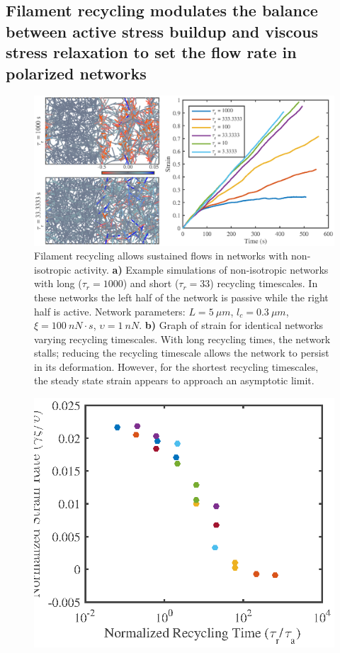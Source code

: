 \documentclass[10pt,letterpaper]{article}
\begin{document}
\subsection*{Filament recycling modulates the balance between active stress buildup and viscous stress relaxation to set the flow rate in polarized networks}


\begin{figure}[h!]
\centering
\includegraphics[width=\hsize]{figures/figure6a}
\caption{\label{fig:flow_ex}  Filament recycling allows sustained flows in networks with non-isotropic activity. \textbf{a)} Example simulations of non-isotropic networks with long ($\tau_r=1000$) and short ($\tau_r=33$) recycling timescales. In these networks the left half of the network is passive while the right half is active.  Network parameters: $L=5\: \mu m$, $l_c=0.3\: \mu m$, $\xi=100\: nN\cdot s$, $\upsilon=1\: nN$. \textbf{b)} Graph of strain for identical networks varying recycling timescales.  With long recycling times, the network stalls; reducing the recycling timescale allows the network to persist in its deformation.  However, for the shortest recycling timescales, the steady state strain appears to approach an asymptotic limit. }
\end{figure}


\begin{figure}[h!]
\centering
\includegraphics[width=\hsize]{figures/figure6b}
\caption{\label{fig:flow_form}  }
\end{figure}
\end{document}

